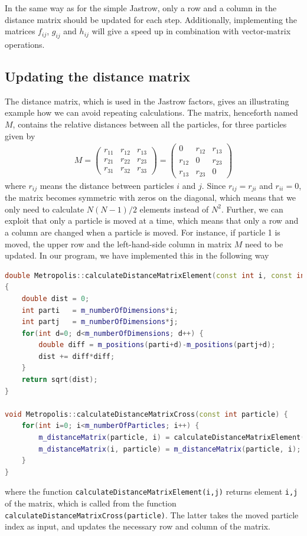 In the same way as for the simple Jastrow, only a row and a column in the distance matrix should be updated for each step. Additionally, implementing the matrices $f_{ij}$, $g_{ij}$ and $h_{ij}$ will give a speed up in combination with vector-matrix operations. 

\subsection{Updating the distance matrix} \label{sec:distancematrix}
The distance matrix, which is used in the Jastrow factors, gives an illustrating example how we can avoid repeating calculations. The matrix, henceforth named $M$, contains the relative distances between all the particles, for three particles given by
\begin{eqnarray}
M=
\begin{pmatrix}
r_{11} & r_{12} & r_{13} \\
r_{21} & r_{22} & r_{23} \\
r_{31} & r_{32} & r_{33}
\end{pmatrix}
=
\begin{pmatrix}
0 & r_{12} & r_{13} \\
r_{12} & 0 & r_{23} \\
r_{13} & r_{23} & 0
\end{pmatrix}
\end{eqnarray}
where $r_{ij}$ means the distance between particles $i$ and $j$. Since $r_{ij}=r_{ji}$ and $r_{ii}=0$, the matrix becomes symmetric with zeros on the diagonal, which means that we only need to calculate $N(N-1)/2$ elements instead of $N^2$. Further, we can exploit that only a particle is moved at a time, which means that only a row and a column are changed when a particle is moved. For instance, if particle 1 is moved, the upper row and the left-hand-side column in matrix $M$ need to be updated. In our program, we have implemented this in the following way
\lstset{basicstyle=\scriptsize}
\begin{lstlisting}[language=c++,caption={When a particle is moved, we update a row and a column in the distance matrix. The functions are parts of the Metropolis class, as the distance matrix is updated for every step in the Metropolis sampling. Taken from \lstinline{metropolis.cpp}.}]
double Metropolis::calculateDistanceMatrixElement(const int i, const int j) 
{
	double dist = 0;
	int parti   = m_numberOfDimensions*i;
	int partj   = m_numberOfDimensions*j;
	for(int d=0; d<m_numberOfDimensions; d++) {
		double diff = m_positions(parti+d)-m_positions(partj+d);
		dist += diff*diff;
	}
	return sqrt(dist);
}

void Metropolis::calculateDistanceMatrixCross(const int particle) {
	for(int i=0; i<m_numberOfParticles; i++) {
		m_distanceMatrix(particle, i) = calculateDistanceMatrixElement(particle, i);
		m_distanceMatrix(i, particle) = m_distanceMatrix(particle, i);
	}
}
\end{lstlisting}
where the function \lstinline{calculateDistanceMatrixElement(i,j)} returns element \lstinline{i,j} of the matrix, which is called from the function \lstinline{calculateDistanceMatrixCross(particle)}. The latter takes the moved particle index as input, and updates the necessary row and column of the matrix. 

